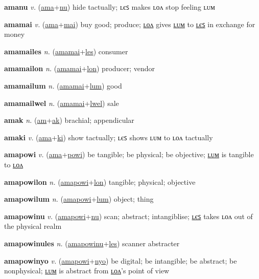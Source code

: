 \textbf{\hypertarget{amanu}{amanu}} \textit{v.} (\hyperlink{ama}{ama}+\allowbreak \hyperlink{nu}{nu})
hide tactually; ʟєꜱ makes ʟᴏᴧ stop feeling ʟᴜᴍ

\textbf{\hypertarget{amamai}{amamai}} \textit{v.} (\hyperlink{ama}{ama}+\allowbreak \hyperlink{mai}{mai})
buy good; produce; \hyperlink{amamailon}{ʟᴏᴧ} gives \hyperlink{amamailum}{ʟᴜᴍ} to \hyperlink{amamailes}{ʟєꜱ} in exchange for money

\textbf{\hypertarget{amamailes}{amamailes}} \textit{n.} (\hyperlink{amamai}{amamai}+\allowbreak \hyperlink{les}{les})
consumer

\textbf{\hypertarget{amamailon}{amamailon}} \textit{n.} (\hyperlink{amamai}{amamai}+\allowbreak \hyperlink{lon}{lon})
producer; vendor

\textbf{\hypertarget{amamailum}{amamailum}} \textit{n.} (\hyperlink{amamai}{amamai}+\allowbreak \hyperlink{lum}{lum})
good

\textbf{\hypertarget{amamailwel}{amamailwel}} \textit{n.} (\hyperlink{amamai}{amamai}+\allowbreak \hyperlink{lwel}{lwel})
sale

\textbf{\hypertarget{amak}{amak}} \textit{n.} (\hyperlink{am}{am}+\allowbreak \hyperlink{ak}{ak})
brachial; appendicular

\textbf{\hypertarget{amaki}{amaki}} \textit{v.} (\hyperlink{ama}{ama}+\allowbreak \hyperlink{ki}{ki})
show tactually; ʟєꜱ shows ʟᴜᴍ to ʟᴏᴧ tactually

\textbf{\hypertarget{amapowi}{amapowi}} \textit{v.} (\hyperlink{ama}{ama}+\allowbreak \hyperlink{powi}{powi})
be tangible; be physical; be objective; \hyperlink{amapowilum}{ʟᴜᴍ} is tangible to \hyperlink{amapowilon}{ʟᴏᴧ}

\textbf{\hypertarget{amapowilon}{amapowilon}} \textit{n.} (\hyperlink{amapowi}{amapowi}+\allowbreak \hyperlink{lon}{lon})
tangible; physical; objective

\textbf{\hypertarget{amapowilum}{amapowilum}} \textit{n.} (\hyperlink{amapowi}{amapowi}+\allowbreak \hyperlink{lum}{lum})
object; thing

\textbf{\hypertarget{amapowinu}{amapowinu}} \textit{v.} (\hyperlink{amapowi}{amapowi}+\allowbreak \hyperlink{nu}{nu})
scan; abstract; intangiblise; \hyperlink{amapowinules}{ʟєꜱ} takes ʟᴏᴧ out of the physical realm

\textbf{\hypertarget{amapowinules}{amapowinules}} \textit{n.} (\hyperlink{amapowinu}{amapowinu}+\allowbreak \hyperlink{les}{les})
scanner abstracter

\textbf{\hypertarget{amapowinyo}{amapowinyo}} \textit{v.} (\hyperlink{amapowi}{amapowi}+\allowbreak \hyperlink{nyo}{nyo})
be digital; be intangible; be abstract; be nonphysical; \hyperlink{amapowinyolum}{ʟᴜᴍ} is abstract from \hyperlink{amapowinyolon}{ʟᴏᴧ}’s point of view

